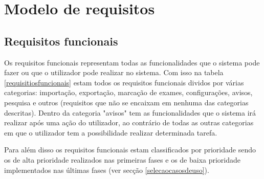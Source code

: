\documentclass[11pt, twoside]{report}
\begin{document}
	\chapter{Modelo de requisitos}
	\section{Requisitos funcionais}
	
	
	Os requisitos funcionais representam todas as funcionalidades que o sistema pode fazer ou que o utilizador pode realizar no sistema. Com isso na tabela \ref{requisitiosfuncionais} estam todos os requisitos funcionais dividos por várias categorias: importação, exportação, marcação de exames, configurações, avisos, pesquisa e outros (requisitos que não se encaixam em nenhuma das categorias descritas). Dentro da categoria "avisos" tem as funcionalidades que o sistema irá realizar após uma ação do utilizador, ao contrário de todas as outras categorias em que o utilizador tem a possibilidade realizar determinada tarefa.
	
	Para além disso os requisitos funcionais estam classificados por prioridade sendo os de alta prioridade realizados nas primeiras fases e os de baixa prioridade implementados nas últimas fases (ver secção \ref{selecaocasosdeuso}).  
	
	
	
\end{document}
